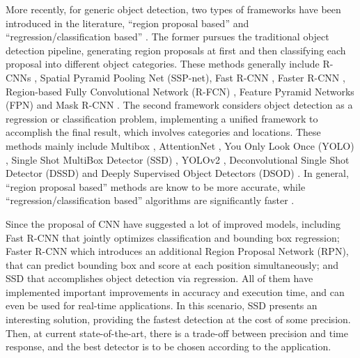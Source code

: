 \documentclass[journal]{IEEEtran}
\begin{document}
More recently, for generic object detection, two types of frameworks have been introduced in the literature, ``region proposal based'' and ``regression/classification based'' \cite{zhao2019object}. The former pursues the traditional object detection pipeline, generating region proposals at first and then classifying each proposal into different object categories. These methods generally include R-CNNs \cite{ObjectDetec2014}, Spatial Pyramid Pooling Net (SSP-net), Fast R-CNN \cite{girshick2015fast}, Faster R-CNN \cite{fasterObject2015}, Region-based Fully Convolutional Network (R-FCN) \cite{dai2016r}, Feature Pyramid Networks (FPN) \cite{lin2017feature} and Mask R-CNN \cite{he2017mask}. The second framework considers object detection as a regression or classification problem, implementing a unified framework to accomplish the final result, which involves categories and locations. These methods mainly include Multibox \cite{erhan2014scalable}, AttentionNet \cite{yoo2015attentionnet}, You Only Look Once (YOLO) \cite{redmon2016you}, Single Shot MultiBox Detector (SSD) \cite{liu2016ssd}, YOLOv2 \cite{redmon2017yolo9000}, Deconvolutional Single Shot Detector (DSSD) \cite{fu2017dssd} and Deeply Supervised Object Detectors (DSOD) \cite{shen2017dsod}. In general, ``region proposal based'' methods are know to be more accurate, while ``regression/classification based'' algorithms are significantly faster \cite{zhao2019object}. 

Since the proposal of CNN have suggested a lot of improved models, including Fast R-CNN that jointly optimizes classification and bounding box regression; Faster R-CNN which introduces an additional Region Proposal Network (RPN), that can predict bounding box and score at each position simultaneously; and SSD that accomplishes object detection via regression. All of them have implemented important improvements in accuracy and execution time, and can even be used for real-time applications. In this scenario, SSD presents an interesting solution, providing the fastest detection at the cost of some precision. Then, at current state-of-the-art, there is a trade-off between precision and time response, and the best detector is to be chosen according to the application.
\end{document}
